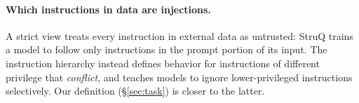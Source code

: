 \paragraph{Which instructions in data are injections.}
A strict view treats every instruction in external data as untrusted: StruQ \citep{chen2024struq} trains a model to
follow only instructions in the prompt portion of its input. The instruction hierarchy \citep{wallace2024hierarchy}
instead defines behavior for instructions of different privilege that \emph{conflict}, and teaches models to ignore
lower-privileged instructions selectively. Our definition (\S\ref{sec:task}) is closer to the latter.
